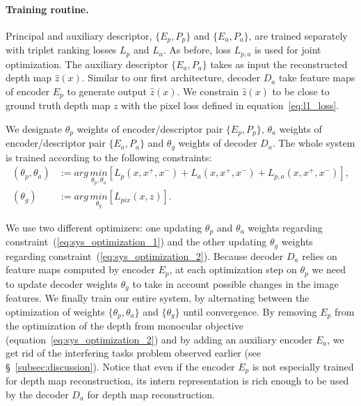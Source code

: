 \paragraph{Training routine.}
\label{subsec:training}
Principal and auxiliary descriptor, $\{E_p, P_p\}$ and $\{E_a, P_a\}$, are trained separately with triplet ranking losses $L_p$ and $L_a$. As before, loss $L_{p, a}$ is used for joint optimization. The auxiliary descriptor $\{E_a, P_a\}$ takes as input the reconstructed depth map $\hat{z}(x)$. Similar to our first architecture, decoder $D_a$ take feature maps of encoder $E_p$ to generate output $\hat{z}(x)$. We constrain $\hat{z}(x)$ to be close to ground truth depth map $z$ with the pixel loss defined in equation~\ref{eq:l1_loss}. 

We designate $\theta_p$ weights of encoder/descriptor pair $\{E_p, P_p\}$,  $\theta_a$ weights of encoder/descriptor pair $\{E_a, P_a\}$ and $\theta_g$ weights of decoder $D_a$. The whole system is trained according to the following constraints:
\begin{align}
	\left( \theta_{p}, \theta_{a} \right) & := arg\,\underset{\theta_p, \theta_a}{min} \left[ L_p(x, x^+, x^-) + L_a(x, x^+, x^-) + L_{p,a}(x, x^+, x^-) \right], \label{eq:sys_optimization_1} \\ 	
	\left( \theta_{g} \right) & := arg\,\underset{\theta_{g}}{min} \left[ L_{pix}(x, z) \right]. 	\label{eq:sys_optimization_2}
\end{align}

We use two different optimizers: one updating $\theta_{p}$ and $\theta_{a}$ weights regarding constraint~(\ref{eq:sys_optimization_1}) and the other updating $\theta_{g}$ weights regarding constraint~(\ref{eq:sys_optimization_2}). Because decoder $D_a$ relies on feature maps computed by encoder $E_p$, at each optimization step on $\theta_p$ we need to update decoder weights $\theta_g$ to take in account possible changes in the image features. We finally train our entire system, by alternating between the optimization of weights $\{\theta_p, \theta_a\}$ and $\{\theta_g\}$ until convergence. By removing $E_p$ from the optimization of the depth from monocular objective (equation~\ref{eq:sys_optimization_2}) and by adding an auxiliary encoder $E_a$, we get rid of the interfering tasks problem observed earlier (see \S~\ref{subsec:discussion}). Notice that even if the encoder $E_p$ is not especially trained for depth map reconstruction, its intern representation is rich enough to be used by the decoder $D_a$ for depth map reconstruction.

